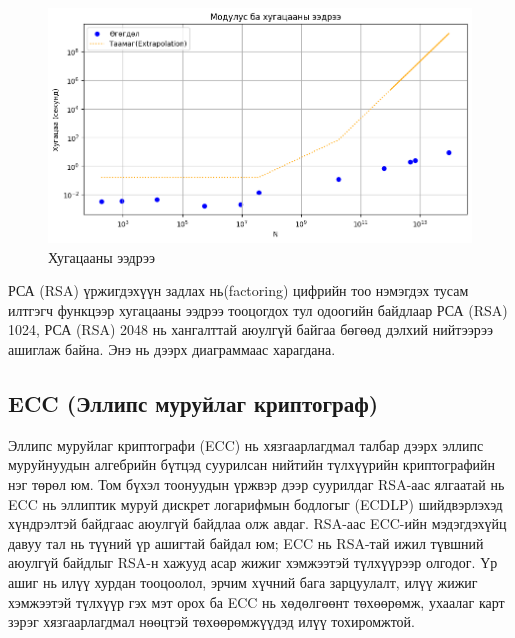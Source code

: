 	\begin{figure}[h]
		\centering
		\includegraphics[scale=0.73]{assets/rsacomplexity.png}
		\caption{Хугацааны ээдрээ}
		\label{fig:rsacomplexity}
	\end{figure}

РСА (RSA) үржигдэхүүн задлах нь(factoring) цифрийн тоо нэмэгдэх тусам илтгэгч функцээр хугацааны ээдрээ тооцогдох тул одоогийн байдлаар РСА (RSA) 1024, РСА (RSA) 2048 нь хангалттай аюулгүй байгаа бөгөөд дэлхий нийтээрээ ашиглаж байна. Энэ нь дээрх диаграммаас харагдана.

\subsection{ECC (Эллипс муруйлаг криптограф)}

Эллипс муруйлаг криптографи (ECC) нь хязгаарлагдмал талбар дээрх эллипс муруйнуудын алгебрийн бүтцэд суурилсан нийтийн түлхүүрийн криптографийн нэг төрөл юм. Том бүхэл тоонуудын үржвэр дээр суурилдаг RSA-аас ялгаатай нь ECC нь эллиптик муруй дискрет логарифмын бодлогыг (ECDLP) шийдвэрлэхэд хүндрэлтэй байдгаас аюулгүй байдлаа олж авдаг. RSA-аас ECC-ийн мэдэгдэхүйц давуу тал нь түүний үр ашигтай байдал юм; ECC нь RSA-тай ижил түвшний аюулгүй байдлыг RSA-н хажууд асар жижиг хэмжээтэй түлхүүрээр олгодог. Үр ашиг нь илүү хурдан тооцоолол, эрчим хүчний бага зарцуулалт, илүү жижиг хэмжээтэй түлхүүр гэх мэт орох ба ECC нь хөдөлгөөнт төхөөрөмж, ухаалаг карт зэрэг хязгаарлагдмал нөөцтэй төхөөрөмжүүдэд илүү тохиромжтой.
